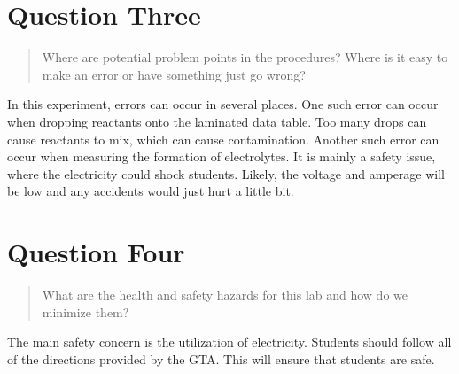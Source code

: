 \documentclass[11pt, letterpaper]{article}
\begin{document}
\section{Question Three}
\begin{quote}
    Where are potential problem points in the procedures? Where is it easy to make an error 
    or have something just go wrong?
\end{quote}

In this experiment, errors can occur in several places.
One such error can occur when dropping reactants onto the laminated data table.
Too many drops can cause reactants to mix, which can cause contamination.
Another such error can occur when measuring the formation of electrolytes.
It is mainly a safety issue, where the electricity could shock students.
Likely, the voltage and amperage will be low and any accidents would just hurt a little bit.

\section{Question Four}
\begin{quote}
    What are the health and safety hazards for this lab and how do we minimize them?
\end{quote}

The main safety concern is the utilization of electricity.
Students should follow all of the directions provided by the GTA.
This will ensure that students are safe.
\end{document}
